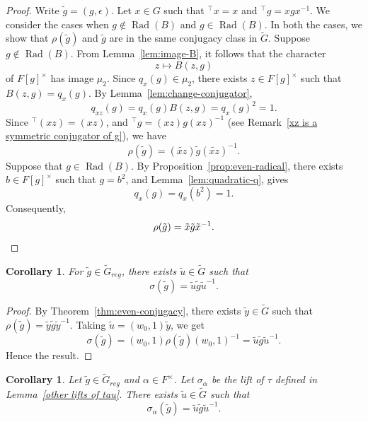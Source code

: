 \documentclass[11pt, a4paper, reqno]{amsart}
\newtheorem{corollary}[theorem]{Corollary}
\theoremstyle{definition}
\theoremstyle{remark}
\theoremstyle{example}
\theoremstyle{note}
\numberwithin{equation}{section}
\DeclareMathOperator{\Rad}{Rad}
\begin{document}
\begin{proof} Write $\tilde{g}=(g,\epsilon).$ Let $x\in G$ such that $^{\top}x=x$ and $^{\top}g=xgx^{-1}$.
We consider the cases when $g\notin \Rad(B)$ and $g\in\Rad(B)$. In both the cases, we show that $\rho(\tilde{g})$ and $\tilde{g}$ are in the same conjugacy class in $\widetilde{G}$. Suppose $g\notin\Rad(B).$ From Lemma~\ref{lem:image-B}, it follows that the character
\begin{equation*}
z\longmapsto B(z,g)
\end{equation*}
of $F[g]^{\times}$ has image $\mu_2$. Since $q_{x}(g)\in\mu_2$, there exists
$z\in F[g]^\times$ such that $B(z,g)=q_x(g)$. By Lemma~\ref{lem:change-conjugator},
\[
q_{xz}(g)=q_x(g)B(z,g)=q_x(g)^2=1.
\]
Since $^{\top}(xz)=(xz)$, and $^{\top}g=(xz)g(xz)^{-1}$ (see Remark~\ref{xz is a symmetric conjugator of g}), we have 
\[
\rho(\tilde{g})
=(\widetilde{xz})\tilde{g}(\widetilde{xz})^{-1}.
\]
Suppose that $g\in\Rad(B).$ By Proposition~\ref{prop:even-radical}, there exists $b\in F[g]^\times$ such that $g=b^2$, and Lemma~\ref{lem:quadratic-q}, gives
\[
q_{x}(g)=q_{x}(b^{2})=1.
\]
Consequently,
\[
\rho(\tilde{g})
=\tilde{x}\tilde{g}\tilde{x}^{-1}.  \qedhere
\] 
\end{proof}



\begin{corollary}\label{conjugacy statement wrt sigma} For $\tilde{g}\in \widetilde{G}_{reg}$, there exists $\tilde{u}\in\widetilde{G}$ such that 
\[\sigma(\tilde{g})=\tilde{u}\tilde{g}\tilde{u}^{-1}.
\]
\end{corollary}

\begin{proof} By Theorem~\ref{thm:even-conjugacy}, there exists $\tilde{y}\in\widetilde{G}$ such that $\rho(\tilde{g})=\tilde{y}\tilde{g}\tilde{y}^{-1}.$ Taking $\tilde{u} = (w_{0}, 1) \tilde{y}$, we get 
$$\sigma(\tilde{g})= (w_{0}, 1) \rho(\tilde{g}) (w_{0}, 1)^{-1} = \tilde{u}\tilde{g}\tilde{u}^{-1}.$$
Hence the result.
\end{proof}






\begin{corollary}\label{conjugacy statement wrt sigma alpha} Let $\tilde{g}\in \widetilde{G}_{reg}$ and $\alpha\in F^{\times}$. Let $\sigma_{\alpha}$ be the lift of $\tau$ defined in Lemma~\ref{other lifts of tau}. There exists $\tilde{u}\in\widetilde{G}$ such that 
\[\sigma_\alpha(\tilde{g})=\tilde{u}\tilde{g}\tilde{u}^{-1}.
\]
 \end{corollary}
\end{document}
